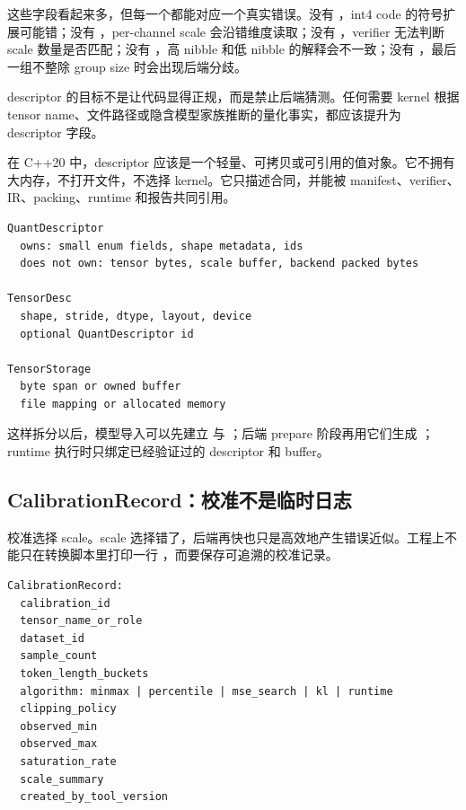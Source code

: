 这些字段看起来多，但每一个都能对应一个真实错误。没有 ，int4 code 的符号扩展可能错；没有 ，per-channel scale 会沿错维度读取；没有 ，verifier 无法判断 scale 数量是否匹配；没有 ，高 nibble 和低 nibble 的解释会不一致；没有 ，最后一组不整除 group size 时会出现后端分歧。

\begin{warningbox}
descriptor 的目标不是让代码显得正规，而是禁止后端猜测。任何需要 kernel 根据 tensor name、文件路径或隐含模型家族推断的量化事实，都应该提升为 descriptor 字段。
\end{warningbox}

在 C++20 中，descriptor 应该是一个轻量、可拷贝或可引用的值对象。它不拥有大内存，不打开文件，不选择 kernel。它只描述合同，并能被 manifest、verifier、IR、packing、runtime 和报告共同引用。

\begin{lstlisting}[numbers=none,caption={C++20 中 descriptor 的责任边界}]
QuantDescriptor
  owns: small enum fields, shape metadata, ids
  does not own: tensor bytes, scale buffer, backend packed bytes

TensorDesc
  shape, stride, dtype, layout, device
  optional QuantDescriptor id

TensorStorage
  byte span or owned buffer
  file mapping or allocated memory
\end{lstlisting}

这样拆分以后，模型导入可以先建立  与 ；后端 prepare 阶段再用它们生成 ；runtime 执行时只绑定已经验证过的 descriptor 和 buffer。

\subsection{CalibrationRecord：校准不是临时日志}

校准选择 scale。scale 选择错了，后端再快也只是高效地产生错误近似。工程上不能只在转换脚本里打印一行 ，而要保存可追溯的校准记录。

\begin{lstlisting}[numbers=none,caption={校准记录需要保存的事实}]
CalibrationRecord:
  calibration_id
  tensor_name_or_role
  dataset_id
  sample_count
  token_length_buckets
  algorithm: minmax | percentile | mse_search | kl | runtime
  clipping_policy
  observed_min
  observed_max
  saturation_rate
  scale_summary
  created_by_tool_version
\end{lstlisting}

